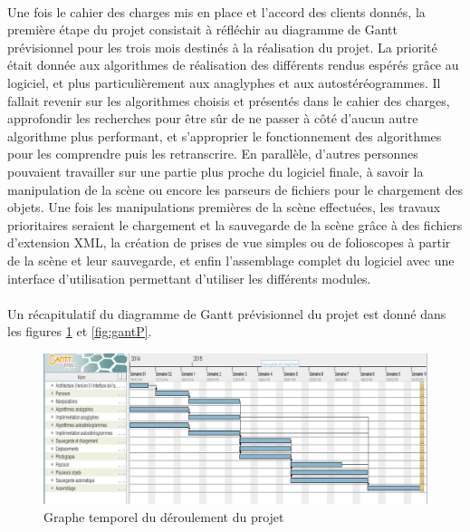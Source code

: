 \paragraph{}
Une fois le cahier des charges mis en place et l'accord des clients donnés, la première étape du projet consistait à réfléchir au diagramme de Gantt prévisionnel pour les trois mois destinés à la réalisation du projet.
La priorité était donnée aux algorithmes de réalisation des différents rendus espérés grâce au logiciel, et plus particulièrement aux anaglyphes et aux autostéréogrammes. Il fallait revenir sur les algorithmes choisis et présentés dans le cahier des charges, approfondir les recherches pour être sûr de ne passer à côté d'aucun autre algorithme plus performant, et s'approprier le fonctionnement des algorithmes pour les comprendre puis les retranscrire.
En parallèle, d'autres personnes pouvaient travailler sur une partie plus proche du logiciel finale, à savoir la manipulation de la scène ou encore les parseurs de fichiers pour le chargement des objets.
Une fois les manipulations premières de la scène effectuées, les travaux prioritaires seraient le chargement et la sauvegarde de la scène grâce à des fichiers d'extension XML, la création de prises de vue simples ou de folioscopes à partir de la scène et leur sauvegarde, et enfin l'assemblage complet du logiciel avec une interface d'utilisation permettant d'utiliser les différents modules.

\paragraph{}
Un récapitulatif du diagramme de Gantt prévisionnel du projet est donné dans les figures \ref{fig:graphGantP} et \ref{fig:gantP}.

\newpage
\begin{figure}[h]
	\centering
	\begin{sideways}
                \includegraphics[scale=0.42]{graphGantP.jpg}
        \end{sideways}
	\caption{\label{fig:graphGantP} Graphe temporel du déroulement du projet \protect \footnotemark }
\end{figure}

